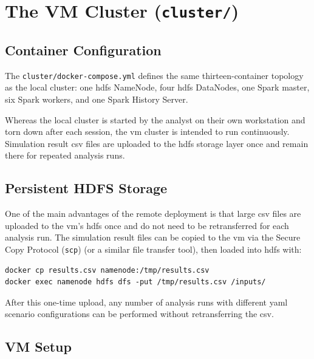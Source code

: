 \section{The VM Cluster (\texttt{cluster/})}
\label{sec:rm-cluster}

\subsection{Container Configuration}
\label{subsec:rm-container-configuration}

The \texttt{cluster/docker-compose.yml} defines the same thirteen-container topology as the
local cluster: one \gls{hdfs} NameNode, four \gls{hdfs} DataNodes, one Spark master, six Spark
workers, and one Spark History Server.

Whereas the local cluster is started by the analyst on
their own workstation and torn down after each session, the \gls{vm} cluster is intended to run
continuously.  Simulation result \gls{csv} files are uploaded to the \gls{hdfs} storage layer
once and remain there for repeated analysis runs.

\subsection{Persistent HDFS Storage}
\label{subsec:rm-persistent-hdfs-storage}

One of the main advantages of the remote deployment is that large \gls{csv} files are uploaded
to the \gls{vm}'s \gls{hdfs} once and do not need to be retransferred for each analysis run.
The simulation result files can be copied to the \gls{vm} via the Secure Copy Protocol
(\texttt{scp}) (or a similar file transfer tool), then loaded into \gls{hdfs} with:

\begin{verbatim}
docker cp results.csv namenode:/tmp/results.csv
docker exec namenode hdfs dfs -put /tmp/results.csv /inputs/
\end{verbatim}

After this one-time upload, any number of analysis runs with different \gls{yaml} scenario
configurations can be performed without retransferring the \gls{csv}.

\subsection{VM Setup}
\label{subsec:rm-vm-setup}

